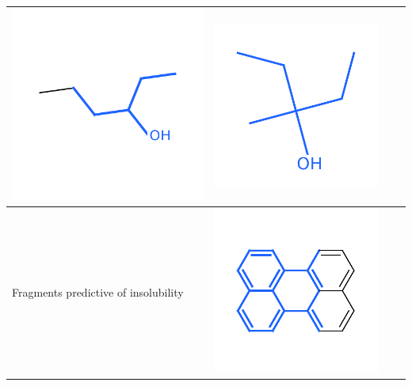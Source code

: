 \documentclass[landscape,a0b,final,a4resizeable]{include/a0poster}
\begin{document}
\begin{poster}
\begin{multicols}{3}
\begin{center}
\begin{tabular}{>{\centering}m{\mywidthb} >{\centering}m{\mywidtha} >{\centering}m{\mywidtha} >{\centering\arraybackslash}m{\mywidtha}}
\includegraphics[width=\mywidtha, clip, trim = 2mm 3mm 2mm 6mm]{figures/fig_6.pdf} &
\includegraphics[width=6cm, clip, trim = 2mm 3mm 2mm 6mm]{figures/fig_7.pdf} \\
\midrule
Fragments predictive of insolubility & 
\includegraphics[width=\mywidtha, clip, trim = 2mm 3mm 2mm 6mm]{figures/fig_8.pdf} &

\end{tabular}
\end{center}
\end{multicols}
\end{poster}
\end{document}
